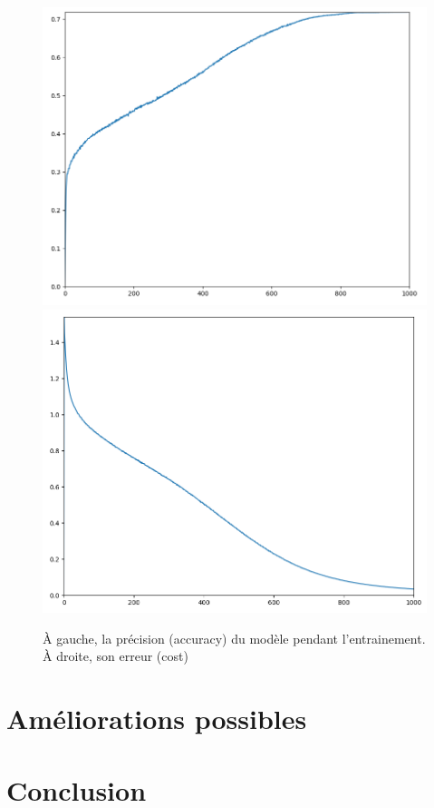 \documentclass{article}
\begin{document}
\begin{figure}[h]
  \includegraphics[scale=0.264]{assets/acc}
  \includegraphics[scale=0.265]{assets/loss}
  
  \caption{À gauche, la précision (accuracy) du modèle pendant l'entrainement. À droite, son erreur (cost)}
  \label{acc_los}
\end{figure}

\section*{Améliorations possibles}

\section*{Conclusion}



\end{document}
